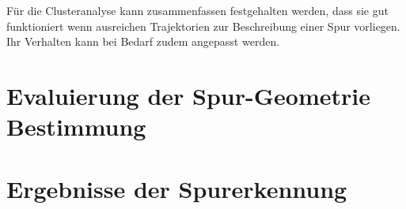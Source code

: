 Für die Clusteranalyse kann zusammenfassen festgehalten werden, dass sie gut funktioniert wenn ausreichen Trajektorien
zur Beschreibung einer Spur vorliegen. Ihr Verhalten kann bei Bedarf zudem angepasst werden.

\section{Evaluierung der Spur-Geometrie Bestimmung}

\section{Ergebnisse der Spurerkennung}
